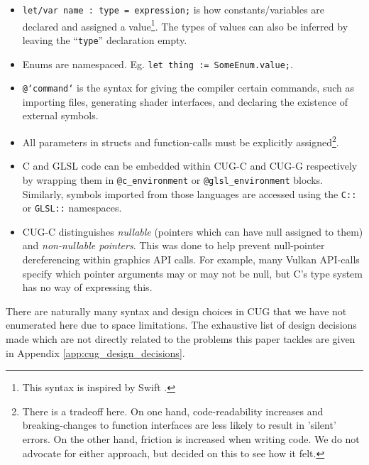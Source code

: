\documentclass[a4paper,12pt,twoside,openright]{report}
\begin{document}
\begin{itemize}

    \item \texttt{let/var name : type = expression;} is how constants/variables
    are declared and assigned a value\footnote{This syntax is inspired by Swift
    \cite{SwiftSyntax}.}. The types of values can also be inferred by leaving
    the ``\texttt{type}'' declaration empty.

    \item Enums are namespaced. Eg. \texttt{let thing := SomeEnum.value;}.

    \item \texttt{@`command`} is the syntax for giving the compiler certain
    commands, such as importing files, generating shader interfaces, and
    declaring the existence of external symbols.

    \item All parameters in structs and function-calls must be explicitly
    assigned\footnote{There is a tradeoff here. On one hand, code-readability
    increases and breaking-changes to function interfaces are less likely to
    result in 'silent' errors. On the other hand, friction is increased when
    writing code. We do not advocate for either approach, but decided on this
    to see how it felt.}.

    \item C and GLSL code can be embedded within CUG-C and CUG-G respectively
    by wrapping them in \texttt{@c\_environment} or \texttt{@glsl\_environment}
    blocks. Similarly, symbols imported from those languages are accessed using
    the \texttt{C::} or \texttt{GLSL::} namespaces.

    \item CUG-C distinguishes \textit{nullable} (pointers which can have null
    assigned to them) and \textit{non-nullable pointers}. This was done to help
    prevent null-pointer dereferencing within graphics API calls. For example,
    many Vulkan API-calls specify which pointer arguments may or may not be
    null, but C's type system has no way of expressing this.

\end{itemize}

There are naturally many syntax and design choices in CUG that we have not
enumerated here due to space limitations. The exhaustive list of design
decisions made which are not directly related to the problems this paper
tackles are given in Appendix \ref{app:cug_design_decisions}.
\end{document}
